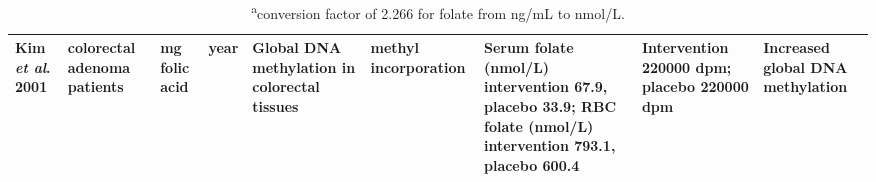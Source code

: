 \begin{sidewaystable}[hp!]
\begin{tabular}{L{1.3cm}C{1.5cm}C{1.5cm}C{1.2cm}C{1.4cm}C{1.5cm}C{2cm}C{2cm}C{1.8cm}}
\parbox[t][2.75cm]{1.3cm}{\raggedright Kim \textit{et al}. 2001 \cite{c440}} &
\parbox[t][2.75cm]{1.5cm}{ colorectal adenoma patients} &
\parbox[t][2.75cm]{1.5cm}{ mg folic acid} &
\parbox[t][2.75cm]{1.2cm}{ year} &
\parbox[t][2.75cm]{1.4cm}{\centering Global DNA methylation in colorectal tissues} &
\parbox[t][2.75cm]{1.5cm}{\centering [\textsuperscript{3}H] methyl incorporation} &
\parbox[t][2.75cm]{2cm}{\centering Serum folate (nmol/L) intervention 67.9, placebo 33.9; RBC folate (nmol/L) intervention 793.1, placebo 600.4} &
\parbox[t][2.75cm]{2.0cm}{\centering Intervention 220000 dpm; placebo 220000 dpm} &
\parbox[t][2.75cm]{1.8cm}{\centering Increased global DNA methylation}\\
\hline
\end{tabular}
\caption*{\footnotesize{\textsuperscript{a}conversion factor of 2.266 for folate from ng/mL to nmol/L.}}
\end{sidewaystable}


